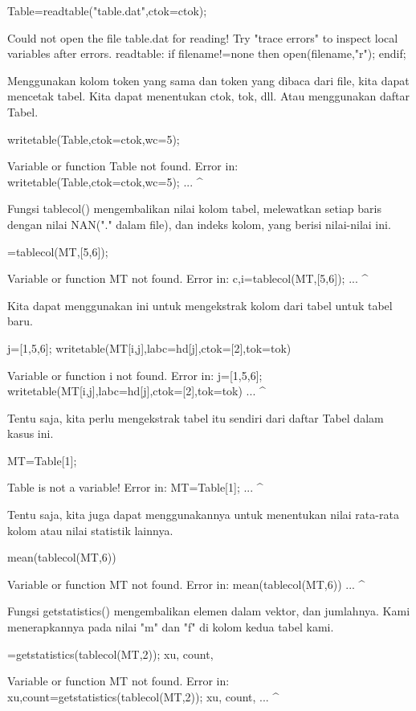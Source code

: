 \documentclass{article}
\begin{document}
\>Table={{readtable("table.dat",ctok=ctok)}};


    Could not open the file
    table.dat
    for reading!
    Try "trace errors" to inspect local variables after errors.
    readtable:
        if filename!=none then open(filename,"r"); endif;

Menggunakan kolom token yang sama dan token yang dibaca dari file,
kita dapat mencetak tabel. Kita dapat menentukan ctok, tok, dll. Atau
menggunakan daftar Tabel.


\>writetable(Table,ctok=ctok,wc=5);


    Variable or function Table not found.
    Error in:
    writetable(Table,ctok=ctok,wc=5); ...
                    ^

Fungsi tablecol() mengembalikan nilai kolom tabel, melewatkan setiap
baris dengan nilai NAN("." dalam file), dan indeks kolom, yang berisi
nilai-nilai ini.


=tablecol(MT,[5,6]);


    Variable or function MT not found.
    Error in:
    {c,i}=tablecol(MT,[5,6]); ...
                     ^

Kita dapat menggunakan ini untuk mengekstrak kolom dari tabel untuk
tabel baru.


\>j=[1,5,6]; writetable(MT[i,j],labc=hd[j],ctok=[2],tok=tok)


    Variable or function i not found.
    Error in:
    j=[1,5,6]; writetable(MT[i,j],labc=hd[j],ctok=[2],tok=tok) ...
                              ^

Tentu saja, kita perlu mengekstrak tabel itu sendiri dari daftar Tabel
dalam kasus ini.


\>MT=Table[1];


    Table is not a variable!
    Error in:
    MT=Table[1]; ...
               ^

Tentu saja, kita juga dapat menggunakannya untuk menentukan nilai
rata-rata kolom atau nilai statistik lainnya.


\>mean(tablecol(MT,6))


    Variable or function MT not found.
    Error in:
    mean(tablecol(MT,6)) ...
                    ^

Fungsi getstatistics() mengembalikan elemen dalam vektor, dan
jumlahnya. Kami menerapkannya pada nilai "m" dan "f" di kolom kedua
tabel kami.


=getstatistics(tablecol(MT,2)); xu, count,


    Variable or function MT not found.
    Error in:
    {xu,count}=getstatistics(tablecol(MT,2)); xu, count, ...
                                        ^
\end{document}
